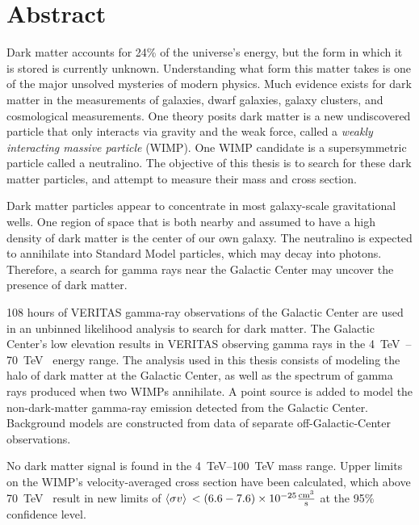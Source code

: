 \cleartooddpage[\thispagestyle{empty}]
\section*{Abstract}

Dark matter accounts for 24\% of the universe's energy, but the form in which it is stored is currently unknown.
Understanding what form this matter takes is one of the major unsolved mysteries of modern physics.
Much evidence exists for dark matter in the measurements of galaxies, dwarf galaxies, galaxy clusters, and cosmological measurements.
One theory posits dark matter is a new undiscovered particle that only interacts via gravity and the weak force, called a \textit{weakly interacting massive particle} (WIMP).
One WIMP candidate is a supersymmetric particle called a neutralino.
The objective of this thesis is to search for these dark matter particles, and attempt to measure their mass and cross section.

Dark matter particles appear to concentrate in most galaxy-scale gravitational wells.
One region of space that is both nearby and assumed to have a high density of dark matter is the center of our own galaxy.
The neutralino is expected to annihilate into Standard Model particles, which may decay into photons.
Therefore, a search for gamma rays near the Galactic Center may uncover the presence of dark matter.

108 hours of VERITAS gamma-ray observations of the Galactic Center are used in an unbinned likelihood analysis to search for dark matter.
The Galactic Center's low elevation results in VERITAS observing gamma rays in the \SIrange{4}{70}{\TeV{}} energy range.
The analysis used in this thesis consists of modeling the halo of dark matter at the Galactic Center, as well as the spectrum of gamma rays produced when two WIMPs annihilate.
A point source is added to model the non-dark-matter gamma-ray emission detected from the Galactic Center.
Background models are constructed from data of separate off-Galactic-Center observations.

No dark matter signal is found in the \SIrange{4}{100}{\TeV} mass range.
Upper limits on the WIMP's velocity-averaged cross section have been calculated, which above \SI{70}{\TeV{}} result in new limits of $\left \langle \sigma v \right \rangle{} < \left ( 6.6-7.6 \right ) \times 10^{-25} \frac{\mathrm{cm}^3}{\mathrm{s}}$ at the 95\% confidence level.



\cleartoevenpage[\thispagestyle{plain}]
\null
